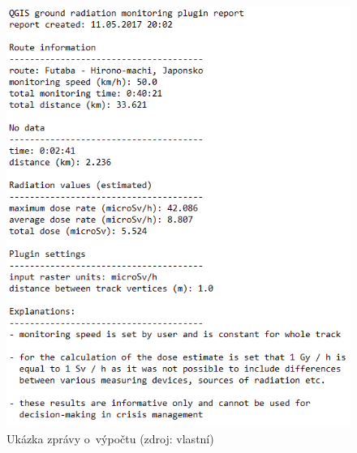 \begin{enumerate}
\begin{itemize}
		\end{itemize}
	
			\begin{figure}[H]
    			\centering
      			\includegraphics[scale=0.9]{./pictures/report.png}
      				\caption[Ukázka zprávy o~výpočtu]{Ukázka zprávy o~výpočtu (zdroj: vlastní)}
     				\label{fig:report}
  			\end{figure}
  			

\end{enumerate}
